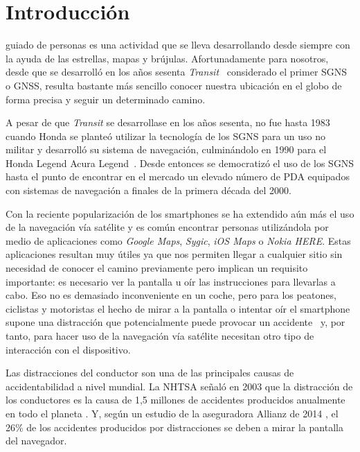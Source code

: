 \chapter{Introducción}
\label{chap:intro}

 guiado de personas es una actividad que se lleva desarrollando desde siempre con la
ayuda de las estrellas, mapas y brújulas. Afortunadamente para nosotros, desde que se desarrolló en
los años sesenta \textit{Transit}~\cite{SN} considerado el primer \acf{SGNS} o \acf{GNSS}, resulta
bastante más sencillo conocer nuestra ubicación en el globo de forma precisa y seguir un determinado
camino.

A pesar de que \textit{Transit} se desarrollase en los años sesenta, no fue hasta 1983 cuando Honda
se planteó utilizar la tecnología de los \acs{SGNS} para un uso no militar y desarrolló su sistema
de navegación, culminándolo en 1990 para el Honda Legend Acura Legend~\cite{Parra13}. Desde entonces
se democratizó el uso de los \acs{SGNS} hasta el punto de encontrar en el mercado un elevado número
de \acf{PDA} equipados con sistemas de navegación a finales de la primera década del 2000.

Con la reciente popularización de los smartphones se ha extendido aún más el uso de la navegación
vía satélite y es común encontrar personas utilizándola por medio de aplicaciones como
\textit{Google Maps}, \textit{Sygic}, \textit{iOS Maps} o \textit{Nokia HERE}. Estas aplicaciones
resultan muy útiles ya que nos permiten llegar a cualquier sitio sin necesidad de conocer el camino
previamente pero implican un requisito importante: es necesario ver la pantalla u oír las
instrucciones para llevarlas a cabo. Eso no es demasiado inconveniente en un coche, pero para los
peatones, ciclistas y motoristas el hecho de mirar a la pantalla o intentar oír el smartphone supone
una distracción que potencialmente puede provocar un accidente~\cite{Valcarcel12} y, por tanto, para
hacer uso de la navegación vía satélite necesitan otro tipo de interacción con el dispositivo.

Las distracciones del conductor son una de las principales causas de accidentabilidad a nivel
mundial. La \acf{NHTSA} señaló en 2003 que la distracción de los conductores es la causa de 1,5
millones de accidentes producidos anualmente en todo el planeta \cite{RACC03}. Y, según un estudio
de la aseguradora Allianz de 2014 \cite{Allianz14}, el 26\% de los accidentes producidos por
distracciones se deben a mirar la pantalla del navegador.

